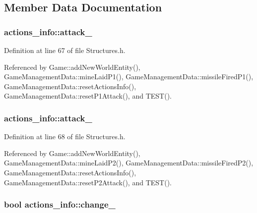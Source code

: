 \subsection{Member Data Documentation}
\hypertarget{structactions__info_a722a3805cc06ba6e5f9627b942f9bbf2}{
\subsubsection[{attack\-\_\-1}]{ actions\-\_\-info\-::attack\-\_}}\label{structactions__info_a722a3805cc06ba6e5f9627b942f9bbf2}


Definition at line 67 of file Structures.\-h.



Referenced by Game\-::add\-New\-World\-Entity(), Game\-Management\-Data\-::mine\-Laid\-P1(), Game\-Management\-Data\-::missile\-Fired\-P1(), Game\-Management\-Data\-::reset\-Actions\-Info(), Game\-Management\-Data\-::reset\-P1\-Attack(), and T\-E\-S\-T().

\hypertarget{structactions__info_a9bfb93ce33b8969b45fa72a12b89be89}{
\subsubsection[{attack\-\_\-2}]{ actions\-\_\-info\-::attack\-\_}}\label{structactions__info_a9bfb93ce33b8969b45fa72a12b89be89}


Definition at line 68 of file Structures.\-h.



Referenced by Game\-::add\-New\-World\-Entity(), Game\-Management\-Data\-::mine\-Laid\-P2(), Game\-Management\-Data\-::missile\-Fired\-P2(), Game\-Management\-Data\-::reset\-Actions\-Info(), Game\-Management\-Data\-::reset\-P2\-Attack(), and T\-E\-S\-T().

\hypertarget{structactions__info_a69ac673533838f973f09492a12516816}{
\subsubsection[{change\-\_\-1}]{\setlength{\rightskip}{0pt plus 5cm}bool actions\-\_\-info\-::change\-\_}}\label{structactions__info_a69ac673533838f973f09492a12516816}



